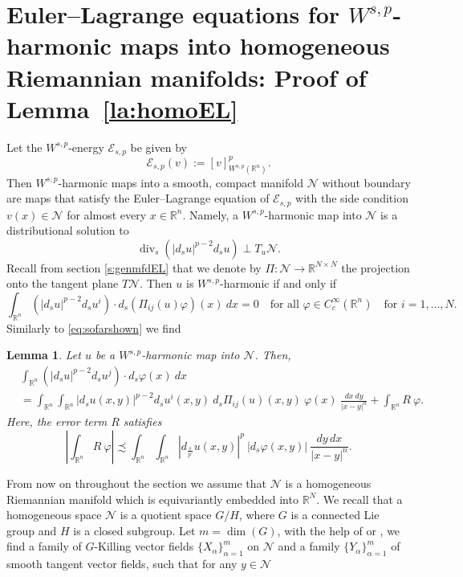 \documentclass[12pt]{amsart}
\def\n{{\mathcal N}}
\newtheorem{lemma}[theorem]{Lemma}
\theoremstyle{definition}
\newcommand{\R}{\mathbb{R}}
\newcommand{\brac}[1]{\left (#1 \right )}
\numberwithin{theorem}{section} \numberwithin{equation}{section}
\renewcommand{\div}{\operatorname{div}}
\newcommand{\aleq}{\precsim}
\begin{document}
% 
% 
% 
\section{Euler--Lagrange equations for \texorpdfstring{$W^{s,p}$}{W(s,p)}-harmonic maps into homogeneous Riemannian manifolds: Proof of Lemma~\ref{la:homoEL}}\label{s:homoEL}
Let the $W^{s,p}$-energy $\mathcal{E}_{s,p}$ be given by
\[
 \mathcal{E}_{s,p}(v) := [v]_{W^{s,p}(\R^n)}^p.
\]
Then $W^{s,p}$-harmonic maps into a smooth, compact manifold $\mathcal{N}$ without boundary are maps that satisfy the Euler--Lagrange equation of $\mathcal{E}_{s,p}$ with the side condition $v(x) \in \mathcal{N}$ for almost every $x \in \R^n$. Namely, a $W^{s,p}$-harmonic map into $\mathcal{N}$ is a distributional solution to
\[
\div_s (|d_s u|^{p-2} d_s u) \perp T_u\mathcal{N}.
\]
Recall from section \ref{s:genmfdEL} that we denote by $\Pi: \mathcal{N} \to \R^{N \times N}$ the projection onto the tangent plane $T\mathcal{N}$. Then $u$ is $W^{s,p}$-harmonic if and only if
\begin{equation}\label{eq:EL}
 \int_{\R^n} \brac{|d_s u|^{p-2} d_su^i} \cdot d_s (\Pi_{ij}(u) \varphi)(x)\ dx = 0 \quad \mbox{for all }\varphi \in C_c^\infty(\R^n) \quad \mbox{for $i=1,\ldots,N$}.
\end{equation}
% 
Similarly to \eqref{eq:sofarshown} we find
% 
\begin{lemma}\label{la:ELeq}
Let $u$ be a $W^{s,p}$-harmonic map into $\n$. Then,
\begin{align*}
 &\int_{\R^n} \brac{|d_s u|^{p-2} d_su^j} \cdot d_s \varphi(x)\ dx\\
 &=\int_{\R^n} \int_{\R^n} |d_s u(x,y)|^{p-2} d_s u^i(x,y)\ d_s\Pi_{ij}(u)(x,y)\ \varphi(x)\ \frac{dx\ dy}{|x-y|^{n}}+ \int_{\R^n} R\ \varphi.
\end{align*}
Here, the error term $R$ satisfies
\[
\left |\int_{\R^n} R\ \varphi \right | \aleq  \int_{\R^n}\int_{\R^n} |d_{\frac{s}{p'}}u(x,y)|^p\ |d_{s}\varphi(x,y)|\ \frac{dy\, dx}{|x-y|^n}.
\]
\end{lemma}
From now on throughout the section we assume that $\n$ is a homogeneous Riemannian manifold which is equivariantly embedded into $\R^N$.
We recall that a homogeneous space $\n$ is a quotient space $G/H$, where $G$ is a connected Lie group and $H$ is a closed subgroup. Let $m=\dim(G)$, with the help of \cite{Freire} or \cite[Lemma 2]{Helein91-sym}, we find a family of $G$-Killing vector fields $\{X_\alpha\}_{\alpha=1}^m$ on $\n$ and a family $\{Y_\alpha\}_{\alpha=1}^m$ of smooth tangent vector fields, such that for any $y\in\n$
\end{document}
